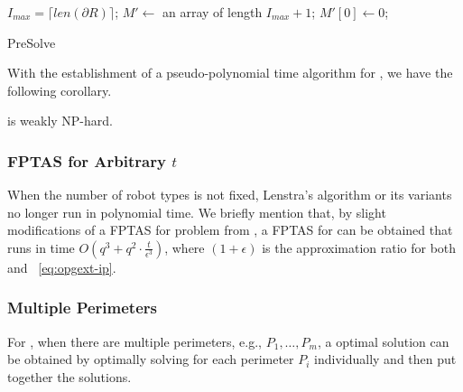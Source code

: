 \begin{algorithm}
	\DontPrintSemicolon
		$I_{max} = \lceil len(\partial R)\rceil$; 
		$M' \leftarrow$ an array of length $I_{max} + 1$; 
		$M'[0]\leftarrow 0$;\;
	\caption{{\sc PreSolve}}\label{algo:opgext-presol}
\end{algorithm}

With the establishment of a pseudo-polynomial time algorithm for \opgmc, we  
have the following corollary. 
\begin{corollary}
	\opgmc is weakly NP-hard. 
\end{corollary}

\subsubsection{FPTAS for Arbitrary $t$}
When the number of robot types is not fixed, Lenstra's algorithm\cite{lenstra1983integer} or 
its variants no longer run in polynomial time. We briefly mention that, 
by slight modifications of a FPTAS for \ttukp problem from \cite{ibarra1975fast}, a FPTAS 
for \opgmc can be obtained that runs in time $O(q^3 + q^2 \cdot \frac{t}{\epsilon^3})$, 
where $(1+\epsilon)$ is the approximation ratio for both \opgmc and ~\eqref{eq:opgext-ip}. 

\subsubsection{Multiple Perimeters} For \opgmc, when there are multiple 
perimeters, e.g., $P_1, \ldots, P_m$, a optimal solution can be obtained 
by optimally solving \opgmc for each perimeter $P_i$ individually and 
then put together the solutions. 

